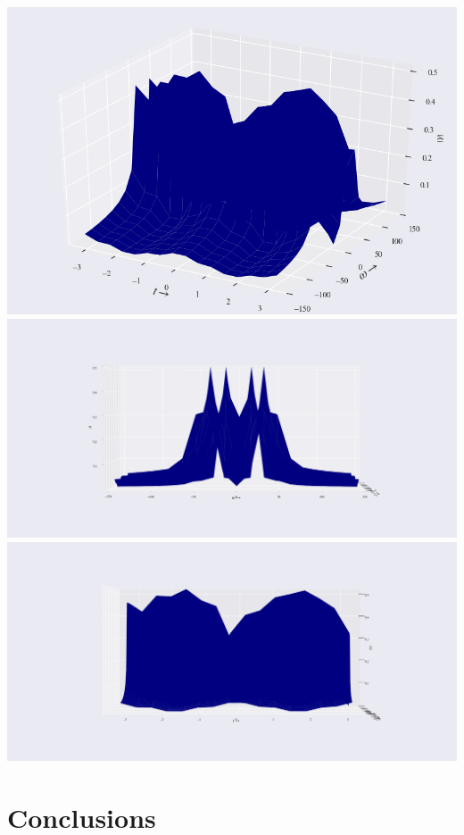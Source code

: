 \documentclass[12pt]{article}
\begin{document}
\begin{center}
    \includegraphics[scale=0.8]{images/fig14.png}
    \includegraphics[scale=0.36]{images/fig14_1.png}
    \includegraphics[scale=0.36]{images/fig14_1_2.png}
\end{center}

\section{Conclusions}
\end{document}
